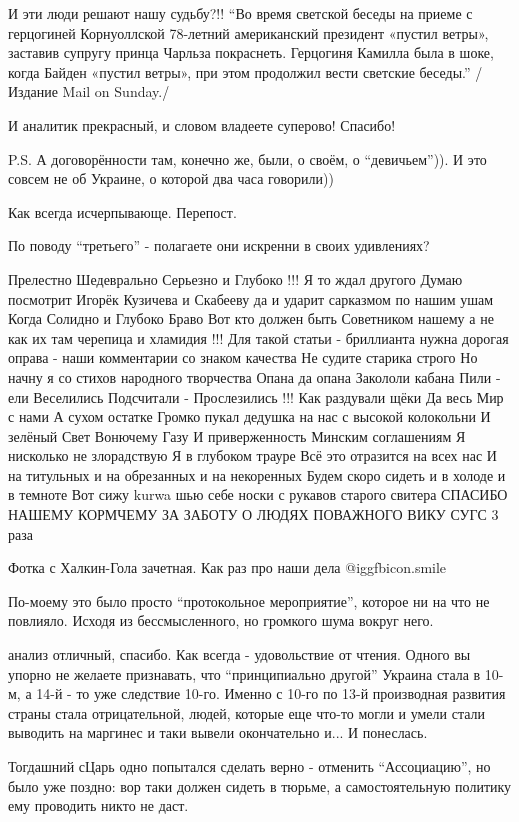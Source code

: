 \begin{itemize}

И эти люди решают нашу судьбу?!! \enquote{Во время светской беседы на приеме с
герцогиней Корнуоллской 78-летний американский президент «пустил ветры»,
заставив супругу принца Чарльза покраснеть. Герцогиня Камилла была в шоке,
когда Байден «пустил ветры», при этом продолжил вести светские беседы.} /
Издание Mail on Sunday./


И аналитик прекрасный, и словом владеете суперово!
Спасибо!

P.S. А договорённости там, конечно же, были, о своём, о \enquote{девичьем})). И
это совсем не об Украине, о которой два часа говорили))

Как всегда исчерпывающе. Перепост.

По поводу \enquote{третьего} - полагаете они искренни в своих удивлениях?


Прелестно Шедеврально Серьезно и Глубоко !!! Я то ждал другого Думаю посмотрит
Игорёк Кузичева и Скабееву да и ударит сарказмом по нашим ушам Когда Солидно и
Глубоко Браво Вот кто должен быть Советником нашему а не как их там черепица и
хламидия !!! Для такой статьи - бриллианта нужна дорогая оправа - наши
комментарии со знаком качества Не судите старика строго Но начну я со стихов
народного творчества Опана да опана Закололи кабана Пили - ели Веселились
Подсчитали - Прослезились !!! Как раздували щёки Да весь Мир с нами А сухом
остатке Громко пукал дедушка на нас с высокой колокольни И зелёный Свет
Вонючему Газу И приверженность Минским соглашениям Я нисколько не злорадствую Я
в глубоком трауре Всё это отразится на всех нас И на титульных и на обрезанных
и на некоренных Будем скоро сидеть и в холоде и в темноте Вот сижу kurwa шью
себе носки с рукавов старого свитера СПАСИБО НАШЕМУ КОРМЧЕМУ ЗА ЗАБОТУ О ЛЮДЯХ
ПОВАЖНОГО ВИКУ СУГС 3 раза

Фотка с Халкин-Гола зачетная.
Как раз про наши дела  @igg{fbicon.smile} 


По-моему это было просто \enquote{протокольное мероприятие}, которое ни на что не
повлияло. Исходя из бессмысленного, но громкого шума вокруг него.


анализ отличный, спасибо. Как всегда - удовольствие от чтения. Одного вы упорно
не желаете признавать, что \enquote{принципиально другой} Украина стала в 10-м, а 14-й
- то уже следствие 10-го. Именно с 10-го по 13-й производная развития страны
стала отрицательной, людей, которые еще что-то могли и умели стали выводить на
маргинес и таки вывели окончательно и... И понеслась.

Тогдашний сЦарь одно попытался сделать верно - отменить \enquote{Ассоциацию}, но было
уже поздно: вор таки должен сидеть в тюрьме, а самостоятельную политику ему
проводить никто не даст.

\end{itemize} %
